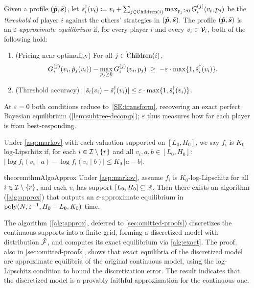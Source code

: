 \begin{definition}
\label{def:eps-equilibrium}
Given a profile $(\tilde{{\bm{p}}}, \tilde{{\bm{s}}})$, let $\tilde{s}^\dagger_i(v_i) \coloneqq v_i + \sum_{j \in \operatorname{Children}(i)} \max_{p_j \ge 0} G^{(j)}_i(v_i, p_j)$ be the \emph{threshold} of player $i$ against the others' strategies in $(\tilde{{\bm{p}}}, \tilde{{\bm{s}}})$. The profile $(\tilde{{\bm{p}}}, \tilde{{\bm{s}}})$ is an \emph{$\varepsilon$-approximate equilibrium} if, for every player $i$ and every $v_i \in \mathcal{V}_i$, both of the following hold:
\begin{enumerate}[label=(\alph*),left=0em]
\item \textup{(Pricing near-optimality)} For all $j \in \operatorname{Children}(i)$,
\[
G^{(j)}_i(v_i, \tilde{p}_j(v_i)) - \max_{p_j \ge 0} G^{(j)}_i(v_i, p_j) \;\ge\; -\varepsilon \cdot \max\{1, \tilde{s}^\dagger_i(v_i)\}.
\]
\item \textup{(Threshold accuracy)} $\;|\tilde{s}_i(v_i) - \tilde{s}^\dagger_i(v_i)| \le \varepsilon \cdot \max\{1, \tilde{s}^\dagger_i(v_i)\}$.
\end{enumerate}
At $\varepsilon = 0$ both conditions reduce to~\eqref{SE:transform}, recovering an exact perfect Bayesian equilibrium (\cref{lem:subtree-decomp}); $\varepsilon$ thus measures how far each player is from best-responding.
\end{definition}

\begin{definition}
\label{asp:lipschitz}
Under \cref{asp:markov} with each valuation supported on $[L_0, H_0]$, we say $f_i$ is $K_0$-log-Lipschitz if, for each $i \in \mathcal{I} \setminus \{r\}$ and all $v_i, a, b \in [L_0, H_0]$:
$|\log f_i(v_i \mid a) - \log f_i(v_i \mid b)| \le K_0\,|a - b|$.
\end{definition}

\begin{restatable}{theorem}{thmAlgoApprox}
\label{thm:algo-approx}
Under \cref{asp:markov}, assume $f_i$ is $K_0$-log-Lipschitz for all $i \in \mathcal{I} \setminus \{r\}$, and each $v_i$ has support $[L_0, H_0] \subseteq \mathbb{R}$. Then there exists an algorithm (\cref{alg:approx}) that outputs an $\varepsilon$-approximate equilibrium in $\mathrm{poly}(N, \varepsilon^{-1}, H_0 - L_0, K_0)$ time.
\end{restatable}

The algorithm (\cref{alg:approx}, deferred to \cref{sec:omitted-proofs}) discretizes the continuous supports into a finite grid, forming a discretized model with distribution $\hat{\mathcal{F}}$, and computes its exact equilibrium via \cref{alg:exact}. The proof, also in \cref{sec:omitted-proofs}, shows that exact equilibria of the discretized model are approximate equilibria of the original continuous model, using the log-Lipschitz condition to bound the discretization error.
The result indicates that the discretized model is a provably faithful approximation for the continuous one.